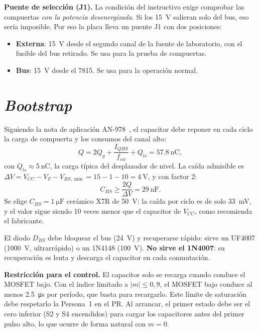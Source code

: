 \documentclass[10pt,twocolumn,letterpaper]{article}
\begin{document}
\textbf{Puente de selección (J1).} La condición del instructivo exige comprobar las compuertas \emph{con la potencia desenergizada}. Si los \SI{15}{\volt} salieran solo del bus, eso sería imposible. Por eso la placa lleva un puente J1 con dos posiciones:
\begin{itemize}[leftmargin=*]
\item \textbf{Externa}: \SI{15}{\volt} desde el segundo canal de la fuente de laboratorio, con el fusible del bus retirado. Se usa para la prueba de compuertas.
\item \textbf{Bus}: \SI{15}{\volt} desde el 7815. Se usa para la operación normal.
\end{itemize}

\section{\emph{Bootstrap}}
Siguiendo la nota de aplicación AN-978~\cite{an978}, el capacitor debe reponer en cada ciclo la carga de compuerta y los consumos del canal alto:
\begin{equation}
Q = 2Q_g + \frac{I_{QBS}}{f_{sw}} + Q_{ls} = \SI{57,8}{\nano\coulomb},
\end{equation}
con $Q_{ls}\approx\SI{5}{\nano\coulomb}$, la carga típica del desplazador de nivel. La caída admisible es $\Delta V=V_{CC}-V_F-V_{BS,\min}=15-1-10=\SI{4}{\volt}$, y con factor 2:
\begin{equation}
C_{BS}\ge\frac{2Q}{\Delta V}=\SI{29}{\nano\farad}.
\end{equation}
Se elige $C_{BS}=\SI{1}{\micro\farad}$ cerámico X7R de \SI{50}{\volt}: la caída por ciclo es de solo \SI{33}{\milli\volt}, y el valor sigue siendo 10 veces menor que el capacitor de $V_{CC}$, como recomienda el fabricante.

El diodo $D_{BS}$ debe bloquear el bus (\SI{24}{\volt}) y recuperarse rápido: sirve un UF4007 (\SI{1000}{\volt}, ultrarrápido) o un 1N4148 (\SI{100}{\volt}). \textbf{No sirve el 1N4007}: su recuperación es lenta y descarga el capacitor en cada conmutación.

\textbf{Restricción para el control.} El capacitor solo se recarga cuando conduce el MOSFET bajo. Con el índice limitado a $|m|\le0{,}9$, el MOSFET bajo conduce al menos \SI{2,5}{\micro\second} por período, que basta para recargarlo. Este límite de saturación debe respetarlo la Persona~1 en el PR. Al arrancar, el primer estado debe ser el cero inferior (S2 y S4 encendidos) para cargar los capacitores antes del primer pulso alto, lo que ocurre de forma natural con $m=0$.
\end{document}
